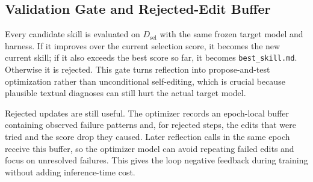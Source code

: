 \documentclass{llmxive}
\begin{document}
\subsection{Validation Gate and Rejected-Edit Buffer}
\label{sec:method_gate}

Every candidate skill is evaluated on $D_{\mathrm{sel}}$ with the same frozen target model and harness. If it improves over the current selection score, it becomes the new current skill; if it also exceeds the best score so far, it becomes \texttt{best\_skill.md}. Otherwise it is rejected. This gate turns reflection into propose-and-test optimization rather than unconditional self-editing, which is crucial because plausible textual diagnoses can still hurt the actual target model.

Rejected updates are still useful. The optimizer records an epoch-local buffer containing observed failure patterns and, for rejected steps, the edits that were tried and the score drop they caused. Later reflection calls in the same epoch receive this buffer, so the optimizer model can avoid repeating failed edits and focus on unresolved failures. This gives the loop negative feedback during training without adding inference-time cost.
\end{document}
